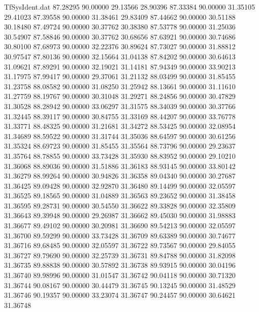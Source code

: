 \begin{filecontents}{TfSysIdent.dat}
  87.28295   90.00000   29.13566   28.90396
  87.33384   90.00000   31.35105   29.41023
  87.39558   90.00000   31.38461   29.83409
  87.44662   90.00000   30.51188   30.18480
  87.49724   90.00000   30.37762   30.38380
  87.53778   90.00000   31.25036   30.54907
  87.58846   90.00000   30.37762   30.68656
  87.63921   90.00000   30.74686   30.80100
  87.68973   90.00000   32.22376   30.89624
  87.73027   90.00000   31.88812   30.97547
  87.80136   90.00000   32.15664   31.04138
  87.84202   90.00000   30.64613   31.09621
  87.89291   90.00000   32.19021   31.14181
  87.94349   90.00000   33.90213   31.17975
  87.99417   90.00000   29.37061   31.21132
  88.03499   90.00000   31.85455   31.23758
  88.08582   90.00000   31.08250   31.25942
  88.13661   90.00000   31.11610   31.27759
  88.19767   90.00000   30.31048   31.29271
  88.24856   90.00000   30.47829   31.30528
  88.28942   90.00000   33.06297   31.31575
  88.34039   90.00000   30.37766   31.32445
  88.39117   90.00000   30.84755   31.33169
  88.44207   90.00000   33.76778   31.33771
  88.48325   90.00000   31.21681   31.34272
  88.53425   90.00000   32.08954   31.34689
  88.59522   90.00000   31.31744   31.35036
  88.64597   90.00000   30.61256   31.35324
  88.69723   90.00000   31.85455   31.35564
  88.73796   90.00000   29.23637   31.35764
  88.78855   90.00000   33.73428   31.35930
  88.83952   90.00000   29.10210   31.36068
  88.89036   90.00000   31.51886   31.36183
  88.93145   90.00000   33.80142   31.36279
  88.99264   90.00000   30.94826   31.36358
  89.04340   90.00000   30.27687   31.36425
  89.09428   90.00000   32.92870   31.36480
  89.14499   90.00000   32.05597   31.36525
  89.18565   90.00000   31.04889   31.36563
  89.23652   90.00000   31.38458   31.36595
  89.28731   90.00000   30.54550   31.36622
  89.33828   90.00000   32.35809   31.36643
  89.39948   90.00000   29.26987   31.36662
  89.45030   90.00000   31.98883   31.36677
  89.49102   90.00000   30.20981   31.36690
  89.54213   90.00000   32.05597   31.36700
  89.59299   90.00000   33.73428   31.36709
  89.63389   90.00000   30.74677   31.36716
  89.68485   90.00000   32.05597   31.36722
  89.73567   90.00000   29.84055   31.36727
  89.79690   90.00000   32.25739   31.36731
  89.84788   90.00000   31.82098   31.36735
  89.88838   90.00000   30.57892   31.36738
  89.93915   90.00000   30.04196   31.36740
  89.98996   90.00000   31.01547   31.36742
  90.04118   90.00000   30.71320   31.36744
  90.08167   90.00000   30.44479   31.36745
  90.13245   90.00000   31.48529   31.36746
  90.19357   90.00000   33.23074   31.36747
  90.24457   90.00000   30.64621   31.36748

\end{filecontents}
